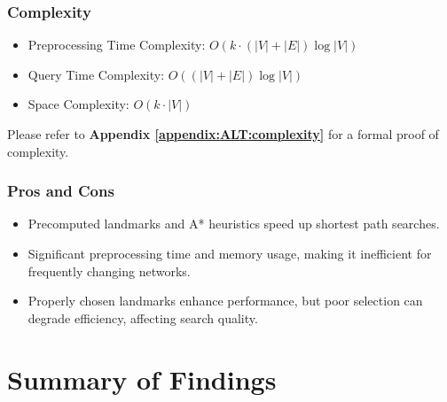 		\subsubsection{Complexity}
				\begin{itemize}
					\item Preprocessing Time Complexity: $ O(k \cdot (|V| + |E|) \log |V|) $
					\item Query Time Complexity: $ O((|V| + |E|) \log |V|)$
					\item Space Complexity: $O(k \cdot |V|)$
				\end{itemize}
				Please refer to \textbf{Appendix \ref{appendix:ALT:complexity}} for a formal proof of complexity.
				
		\subsubsection{Pros and Cons}
		\begin{itemize}
			\item Precomputed landmarks and A* heuristics speed up shortest path searches.
			\item Significant preprocessing time and memory usage, making it inefficient for frequently changing networks.
			\item Properly chosen landmarks enhance performance, but poor selection can degrade efficiency, affecting search quality.
		\end{itemize}

\section{Summary of Findings}
	
